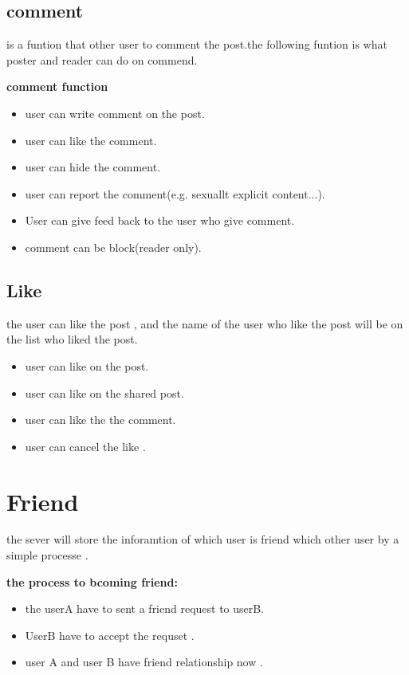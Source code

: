 \subsection{comment}
is a funtion that other user to comment the post.the following funtion is what
poster and reader can do on commend.

\textbf{comment function}
\begin{itemize}
\item user can write comment on the post.
\item user can like the comment.
\item user can hide the comment.
\item user can report the comment(e.g. sexuallt explicit content...).
\item User can give feed back to the user who give comment.
\item comment can be block(reader only).
\end{itemize}

\subsection{Like}
the user can like the post , and the name of the user who like the post will be
on the list who liked the post.

\begin{itemize}
\item user can like on the post.
\item user can like on the shared post.
\item user can like the the comment.
\item user can cancel the like .
\end{itemize}


\section{Friend}
the sever will store the inforamtion of which user is friend which other user by
a simple processe .

\textbf{the process to bcoming friend:}
\begin{itemize}
\item the userA have to sent a friend request to userB.
\item UserB have to accept the requset .
\item user A and user B have friend relationship now .
\end{itemize}


